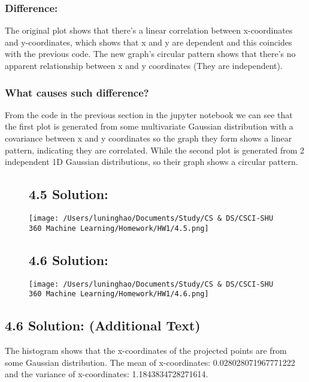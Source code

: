 \documentclass{article}
\begin{document}
\subsubsection*{Difference:}
The original plot shows that there's a linear correlation between x-coordinates and y-coordinates, which shows that x and y are dependent and this coincides with the previous code. The new graph's circular pattern shows that there's no apparent relationship between x and y coordinates (They are independent).

\subsubsection*{What causes such difference?}
From the code in the previous section in the jupyter notebook we can see that the first plot is generated from some multivariate Gaussian distribution with a covariance between x and y coordinates so the graph they form shows a linear pattern, indicating they are correlated. While the second plot is generated from 2 independent 1D Gaussian distributions, so their graph shows a circular pattern.

\begin{figure}[h]
    \centering
    \begin{minipage}{0.45\linewidth}
        \centering
        \subsection*{4.5 Solution:}
        \texttt{[image: /Users/luninghao/Documents/Study/CS \& DS/CSCI-SHU 360 Machine Learning/Homework/HW1/4.5.png]}
    \end{minipage}
    \hfill
    \begin{minipage}{0.45\linewidth}
        \centering
        \subsection*{4.6 Solution:}
        \texttt{[image: /Users/luninghao/Documents/Study/CS \& DS/CSCI-SHU 360 Machine Learning/Homework/HW1/4.6.png]}
    \end{minipage}
\end{figure}

\subsection*{4.6 Solution: (Additional Text)}
The histogram shows that the x-coordinates of the projected points are from some Gaussian distribution. The mean of x-coordinates: 0.028028071967771222 and the variance of x-coordinates: 1.1843834728271614.
\end{document}
